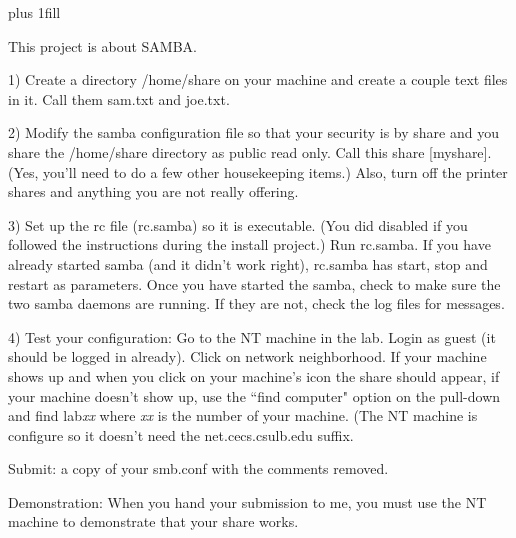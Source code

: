 
\rightskip=0pt plus 1fill

\parindent 0pt

This project is about SAMBA.

1) Create a directory {\ltt{}/home/share} on your machine and
create a couple text files in it. Call them {\ltt{}sam.txt} and 
{\ltt{}joe.txt}.

2) Modify the samba configuration file so that your security is by
share and you share the {\ltt{}/home/share} directory as public
read only. Call this share {\ltt{}[myshare]}. (Yes, you'll need
to do a few other housekeeping items.)
Also, turn off the printer shares and anything you are not really
offering.

3) Set up the rc file ({\ltt{}rc.samba}) so it is executable.
(You did disabled if you followed the instructions during the install
project.) Run {\ltt{}rc.samba}.
If you have already started samba (and it didn't work right), 
{\ltt{}rc.samba} has start, stop and restart as parameters.
Once you have started the samba,
check to make sure the two samba daemons are running.
If they are not, check the log files for messages.

4) Test your configuration: Go to the NT machine in the lab.
Login as guest (it should be logged in already). Click on network 
neighborhood. If your machine shows up and when you click on
your machine's icon the share should appear, if your
machine doesn't show up, use the ``find computer" option on the pull-down
and find {\ltt{}lab}{\it{}xx} where {\it xx} is the number of your machine.
(The NT machine is configure so it doesn't need the {\ltt{}net.cecs.csulb.edu}
suffix.

Submit: a copy of your smb.conf with the comments removed.

Demonstration: When you hand your submission to me, you must use the NT machine
to demonstrate that your share works.
\bye
